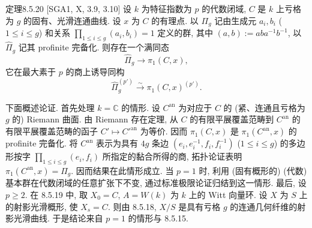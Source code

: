 \begin{origstatement}{定理}{8.5.20}\label{ch08:th8520}
[SGA1, X, 3.9, 3.10] 设 $k$ 为特征指数为 $p$ 的代数闭域, $C$ 是 $k$ 上亏格为 $g$ 的固有、光滑连通曲线. 设 $x$ 为 $C$ 的有理点. 以 $\Pi_g$ 记由生成元 $a_i,b_i$ ($1\leq i\leq g$) 和关系 $\prod_{1\leq i\leq g}(a_i,b_i)=1$ 定义的群, 其中 $(a,b):=aba^{-1}b^{-1}$, 以 $\widehat\Pi_g$ 记其 profinite 完备化. 则存在一个满同态
\[\widehat\Pi_g\longrightarrow\pi_1(C,x),\]
它在最大素于 $p$ 的商上诱导同构
\[\widehat\Pi_g^{(p')}\xrightarrow\sim\pi_1(C,x)^{(p')}.\]
\end{origstatement}
下面概述论证. 首先处理 $k=\mathbb C$ 的情形. 设 $C^{\mathrm{an}}$ 为对应于 $C$ 的 (紧、连通且亏格为 $g$ 的) Riemann 曲面. 由 Riemann 存在定理, 从 $C$ 的有限平展覆盖范畴到 $C^{\mathrm{an}}$ 的有限平展覆盖范畴的函子 $C'\mapsto C'^{\mathrm{an}}$ 为等价. 因而 $\pi_1(C,x)$ 是 $\pi_1(C^{\mathrm{an}},x)$ 的 profinite 完备化. 将 $C^{\mathrm{an}}$ 表示为具有 $4g$ 条边 $(e_i,e_i^{-1},f_i,f_i^{-1})$ ($1\leq i\leq g$) 的多边形按字 $\prod_{1\leq i\leq g}(e_i,f_i)$ 所指定的黏合所得的商, 拓扑论证表明 $\pi_1(C^{\mathrm{an}},x)=\Pi_g$. 因而结果在此情形成立. 当 $p=1$ 时, 利用 (固有概形的) (代数) 基本群在代数闭域的任意扩张下不变, 通过标准极限论证归结到这一情形. 最后, 设 $p\geq2$. 在 8.5.19 中, 取 $X_0=C$, $A=W(k)$ 为 $k$ 上的 Witt 向量环. 设 $X$ 为 $S$ 上的射影光滑概形, 使 $X_s=C$. 则由 8.5.18, $X/S$ 是具有亏格 $g$ 的连通几何纤维的射影光滑曲线. 于是结论来自 $p=1$ 的情形与 8.5.15.

